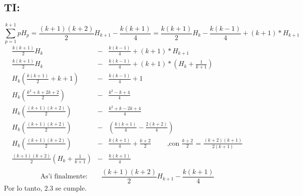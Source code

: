 \subsection{TI:}
\begin{equation*}
 \sum_{p=1}^{k+1} pH_{p} = \frac{(k+1)(k+2)}{2}H_{k+1} - \frac{k(k+1)}{4} =
 \frac{k(k+1)}{2}H_{k} - \frac{k(k-1)}{4} + (k+1)*H_{k+1}
\end{equation*}
\begin{eqnarray*}
 \frac{k(k+1)}{2}H_{k} &-& \frac{k(k-1)}{4} + (k+1)*H_{k+1}\\
 \frac{k(k+1)}{2}H_{k} &-& \frac{k(k-1)}{4} + (k+1)*\left(H_{k} + \frac{1}{k+1}\right)\\
  H_{k}\left( \frac{k(k+1)}{2} + k+1 \right) &-& \frac{k(k-1)}{4} + 1\\
  H_{k}\left( \frac{k^2 + k + 2 k + 2}{2}\right) &-& \frac{k^2 - k + 4}{4}\\
  H_{k}\left( \frac{(k+1)(k+2)}{2}\right) &-& \frac{k^2 + k - 2 k + 4}{4}\\  
  H_{k}\left( \frac{(k+1)(k+2)}{2}\right) &-& \left( \frac{k(k+1)}{4} - \frac{2(k+2)}{4} \right)\\
  H_{k}\left( \frac{(k+1)(k+2)}{2}\right) &-& \frac{k(k+1)}{4} + \frac{k+2}{2} 
  \qquad\textrm{ ,con }\frac{k+2}{2} \textrm{ = }\frac{(k+2)(k+1)}{2(k+1)} \\ 
  \frac{(k+1)(k+2)}{2} \left( H_{k} + \frac{1}{k+1} \right) &-& \frac{k(k+1)}{4}\\
\end{eqnarray*}
\begin{equation*}
  \textrm{As'i finalmente:}\qquad\frac{(k+1)(k+2)}{2}H_{k+1} - \frac{k(k+1)}{4}
\end{equation*}
Por lo tanto, 2.3 se cumple.
